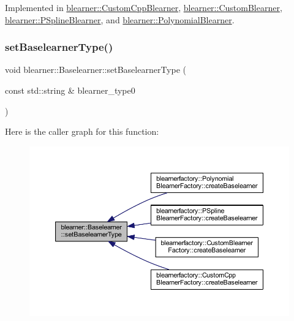 Implemented in \mbox{\hyperlink{classblearner_1_1_custom_cpp_blearner_af2326171640e94c3a00f813781710208}{blearner\+::\+Custom\+Cpp\+Blearner}}, \mbox{\hyperlink{classblearner_1_1_custom_blearner_a401a479834eb3896260cb57b4551ceb4}{blearner\+::\+Custom\+Blearner}}, \mbox{\hyperlink{classblearner_1_1_p_spline_blearner_a9d35aeb36c403c167fb7519379825873}{blearner\+::\+P\+Spline\+Blearner}}, and \mbox{\hyperlink{classblearner_1_1_polynomial_blearner_ae321c17adaab23b0d27685920c2608af}{blearner\+::\+Polynomial\+Blearner}}.

\mbox{\label{classblearner_1_1_baselearner_a8d78e851bae5f5b93dc46eb13d2d1ee1}} 
\subsubsection{\texorpdfstring{set\+Baselearner\+Type()}{setBaselearnerType()}}
{\footnotesize\ttfamily void blearner\+::\+Baselearner\+::set\+Baselearner\+Type (\begin{DoxyParamCaption}\item[{const std\+::string \&}]{blearner\+\_\+type0 }\end{DoxyParamCaption})}

Here is the caller graph for this function\+:
\nopagebreak
\begin{figure}[H]
\begin{center}
\leavevmode
\includegraphics[width=350pt]{classblearner_1_1_baselearner_a8d78e851bae5f5b93dc46eb13d2d1ee1_icgraph}
\end{center}
\end{figure}
\mbox{\label{classblearner_1_1_baselearner_a29122c6125ef6ec03ad84602b3e2d0d4}} 
